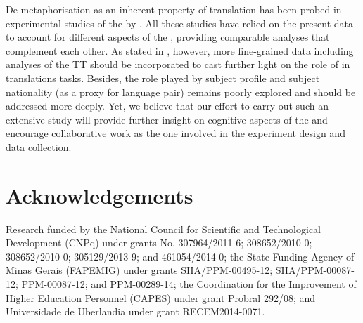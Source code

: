 \documentclass[output=paper]{LSP/langsci}
\begin{document}
De-meta\-phor\-i\-sa\-tion %
%
%
%
as an inherent property of translation has been probed in experimental studies of the  by \citet{daSilva2007, daSilva2012, Alves2010, Alves2011Modeling, Alves2014Effortful, Alves2014Evidence}. All these studies have relied on the present data to account for different aspects of the , providing comparable analyses that complement each other. As stated in \citet{Alves2014Effortful, Alves2014Evidence}, however, more fine-grained data including analyses of the TT should be incorporated to cast further light on the role of  in translations tasks. Besides, the role played by subject profile and subject nationality (as a proxy for language pair) remains poorly explored and should be addressed more deeply. Yet, we believe that our effort to carry out such an extensive study will provide further insight on cognitive aspects of the  and encourage collaborative work as the one involved in the experiment design and data collection.

\section*{Acknowledgements}

Research funded by the National Council for Scientific and Technological Development (CNPq) under grants No. 
307964/2011-6;
308652/2010-0;
308652/2010-0; 
305129/2013-9; and 
461054/2014-0; 
the State Funding Agency of Minas Gerais (FAPEMIG) under grants
SHA/PPM-00495-12; 
SHA/PPM-00087-12; 
PPM-00087-12; and
PPM-00289-14; 
the Coordination for the Improvement of Higher Education Personnel (CAPES) under grant Probral 292/08; and Universidade de Uberlandia under grant RECEM2014-0071.

\sloppy
\printbibliography[heading=subbibliography,notkeyword=this]
\end{document}
